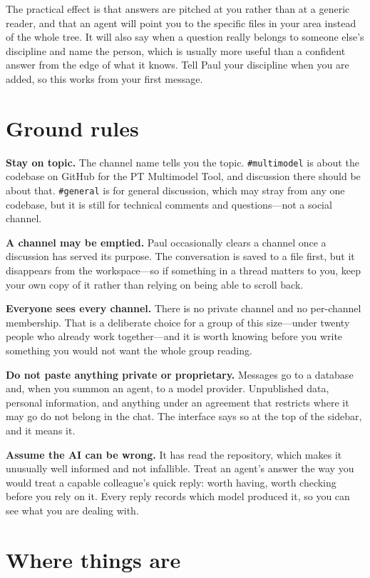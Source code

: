 \documentclass[11pt,letterpaper]{article}
\begin{document}
The practical effect is that answers are pitched at you rather than at a generic
reader, and that an agent will point you to the specific files in your area
instead of the whole tree. It will also say when a question really belongs to
someone else's discipline and name the person, which is usually more useful than
a confident answer from the edge of what it knows. Tell Paul your discipline
when you are added, so this works from your first message.

\section{Ground rules}

\textbf{Stay on topic.} The channel name tells you the topic.
\texttt{\#multimodel} is about the codebase on GitHub for the PT Multimodel
Tool, and discussion there should be about that. \texttt{\#general} is for
general discussion, which may stray from any one codebase, but it is still for
technical comments and questions---not a social channel.

\textbf{A channel may be emptied.} Paul occasionally clears a channel once a
discussion has served its purpose. The conversation is saved to a file first,
but it disappears from the workspace---so if something in a thread matters to
you, keep your own copy of it rather than relying on being able to scroll back.

\textbf{Everyone sees every channel.} There is no private channel and no
per-channel membership. That is a deliberate choice for a group of this
size---under twenty people who already work together---and it is worth knowing
before you write something you would not want the whole group reading.

\textbf{Do not paste anything private or proprietary.} Messages go to a database
and, when you summon an agent, to a model provider. Unpublished data, personal
information, and anything under an agreement that restricts where it may go do
not belong in the chat. The interface says so at the top of the sidebar, and it
means it.

\textbf{Assume the AI can be wrong.} It has read the repository, which makes it
unusually well informed and not infallible. Treat an agent's answer the way you
would treat a capable colleague's quick reply: worth having, worth checking
before you rely on it. Every reply records which model produced it, so you can
see what you are dealing with.

\section{Where things are}
\end{document}
